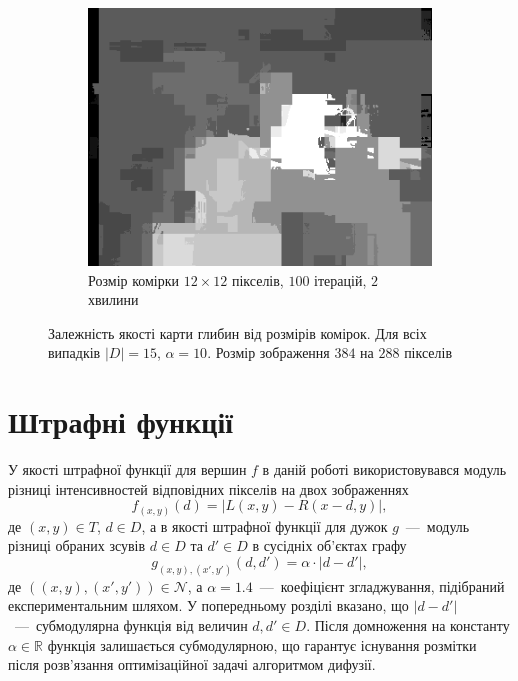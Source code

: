 \begin{figure}[h]
\begin{subfigure}[t]{0.32\textwidth}
        \includegraphics[width=\textwidth]{images/tsukuba_superpixel_12}
        \caption{Розмір комірки $12\times 12$ пікселів,
                 $100$ ітерацій,
                 $2$ хвилини}
    \end{subfigure}
    \caption{Залежність якості карти глибин від розмірів комірок.
             Для всіх випадків $\left| D \right| = 15$, $\alpha = 10$.
             Розмір зображення $384$ на $288$ пікселів}
    \label{fig:superpixel:tsukuba:cell:size}
\end{figure}

\section{Штрафні функції}

У якості штрафної функції для вершин $f$
в даній роботі використовувався модуль різниці
інтенсивностей відповідних пікселів на двох зображеннях
\begin{equation*}
    f_{\left(x, y \right)} \left( d \right) =
    \left| L \left(x, y \right) - R \left(x - d, y \right) \right|,
\end{equation*}
де $\left(x, y \right) \in T$, $d \in D$,
а в якості штрафної функції для дужок $g$~---~модуль різниці обраних зсувів
$d \in D$ та $d' \in D$ в сусідніх об'єктах графу
\begin{equation*}
    g_{\left(x, y \right), \left(x', y' \right)} \left(d, d' \right) =
    \alpha \cdot \left| d - d' \right|,
\end{equation*}
де $\left(\left(x, y \right), \left(x', y' \right) \right) \in \mathcal{N}$,
а $\alpha = 1.4$~---~коефіцієнт згладжування,
підібраний експериментальним шляхом.
У попередньому розділі вказано, що
$\left| d - d' \right|$~---~субмодулярна функція від величин
$d, d' \in D$.
Після домноження на константу $\alpha \in \mathbb{R}$
функція залишається субмодулярною,
що гарантує існування розмітки після розв'язання оптимізаційної задачі
алгоритмом дифузії.

